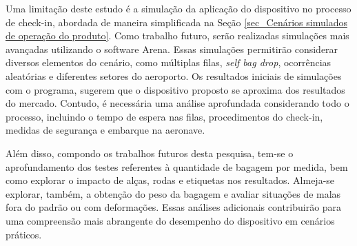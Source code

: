    Uma limitação deste estudo é a simulação da aplicação do dispositivo no processo de check-in, abordada de maneira simplificada na Seção \ref{sec_Cenários simulados de operação do produto}. Como trabalho futuro, serão realizadas simulações mais avançadas utilizando o software Arena. Essas simulações permitirão considerar diversos elementos do cenário, como múltiplas filas, \textit{self bag drop}, ocorrências aleatórias e diferentes setores do aeroporto. Os resultados iniciais de simulações com o programa, sugerem que o dispositivo proposto se aproxima dos resultados do mercado. Contudo, é necessária uma análise aprofundada considerando todo o processo, incluindo o tempo de espera nas filas, procedimentos do check-in, medidas de segurança e embarque na aeronave.
    
    Além disso, compondo os trabalhos futuros desta pesquisa, tem-se o aprofundamento dos testes referentes à quantidade de bagagem por medida, bem como explorar o impacto de alças, rodas e etiquetas nos resultados. Almeja-se explorar, também, a obtenção do peso da bagagem e avaliar situações de malas fora do padrão ou com deformações.  Essas análises adicionais contribuirão para uma compreensão mais abrangente do desempenho do dispositivo em cenários práticos.

 

    